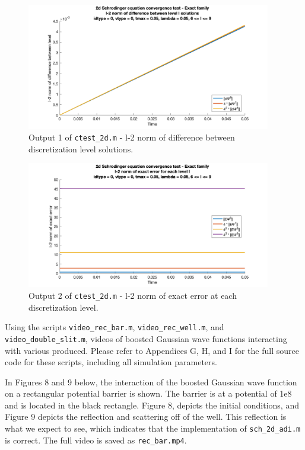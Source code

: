 \documentclass[10pt]{article}
\def\code#1{\texttt{#1}} %
\begin{document}
\begin{figure}[H]
\centering
\includegraphics[width=0.95\textwidth]{problem2/ctest_2d-1.png}
\caption{Output 1 of \code{ctest\_2d.m} - 
l-2 norm of difference between discretization level solutions.}
\end{figure}
\begin{figure}[H]
\centering
\includegraphics[width=0.95\textwidth]{problem2/ctest_2d-2.png}
\caption{Output 2 of \code{ctest\_2d.m} - 
l-2 norm of exact error at each discretization level.}
\end{figure}

Using the scripts \code{video\_rec\_bar.m}, \code{video\_rec\_well.m}, and 
\code{video\_double\_slit.m}, videos of boosted Gaussian wave functions interacting with 
various produced. Please refer to Appendices G, H, and I for the full source code for these scripts,
including all simulation parameters.

In Figures 8 and 9 below, the interaction of the boosted Gaussian wave function on a rectangular
potential barrier is shown. The barrier is at a potential of 1e8 and is located in the black rectangle.
Figure 8, depicts the initial conditions, and Figure 9 depicts the 
reflection and scattering off of the well. This reflection is what we expect to see, which
indicates that the implementation of \code{sch\_2d\_adi.m} is correct. The full video is saved
as \code{rec\_bar.mp4}.
\end{document}
